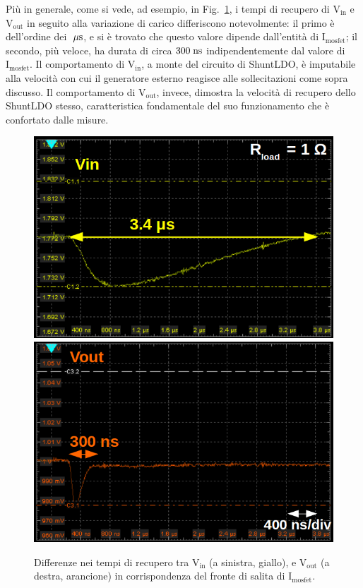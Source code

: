 Pi\`u in generale, come si vede, ad esempio, in Fig.~\ref{DipVoutVin}, i tempi di recupero di $\mathrm{V_{in}}$ e $\mathrm{V_{out}}$ in seguito alla variazione di carico differiscono notevolmente: il primo è dell'ordine dei $\; \mu \rm s$, e si \`e trovato che questo valore dipende dall'entit\`a di $\mathrm{I_{mosfet}}$; il secondo, più veloce, ha durata di circa $300\rm \; ns$ indipendentemente dal valore di $\mathrm{I_{mosfet}}$. Il comportamento di $\mathrm{V_{in}}$, a monte del circuito di ShuntLDO, è imputabile alla velocità con cui il generatore esterno reagisce alle sollecitazioni come sopra discusso. Il comportamento di $\mathrm{V_{out}}$, invece, dimostra la velocità di recupero dello ShuntLDO stesso, caratteristica fondamentale del suo funzionamento che è confortato dalle misure.
\begin{figure}
  \includegraphics[width=.48\linewidth]{Immagini/zoomDipendenzaVoutdaVin1}
  \hfill
  \includegraphics[width=.48\linewidth]{Immagini/zoomDipendenzaVoutdaVin2}
\caption{Differenze nei tempi di recupero tra $\mathrm{V_{in}}$ (a sinistra, giallo), e $\mathrm{V_{out}}$ (a destra, arancione) in corrispondenza del fronte di salita  di $\mathrm{I_{mosfet}}$.}
\label{DipVoutVin}
\end{figure}



